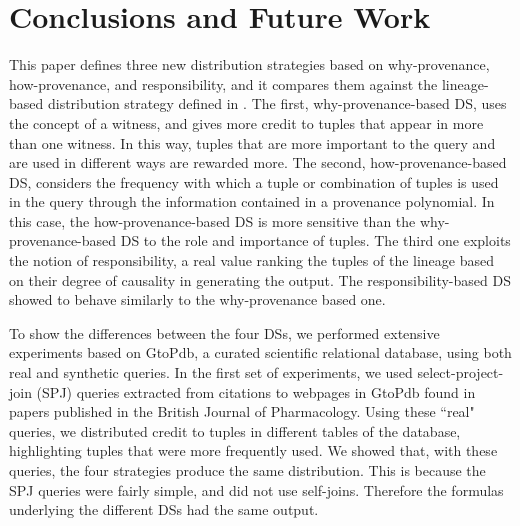 \section{Conclusions and Future Work}
\label{section:conclusions}

This paper 
defines three new distribution strategies based on why-provenance, how-provenance, and responsibility, and it compares them against the lineage-based distribution strategy defined in \cite{dosso2020data}. 
The first, why-provenance-based DS, uses the concept of a witness, and gives more credit to tuples that appear in more than one witness. 
In this way, tuples that are more important to the query and are used in different ways are rewarded more. %
The second, how-provenance-based DS, considers the frequency with which a tuple or combination of tuples is used in the query through the information contained in a provenance polynomial. In this case, the how-provenance-based DS is more sensitive than the why-provenance-based DS to the role and importance of tuples.
The third one exploits the notion of responsibility, a real value ranking the tuples of the lineage based on their degree of causality in generating the output. The responsibility-based DS showed to behave similarly to the why-provenance based one.

To show the differences between the four DSs, we performed extensive experiments based on GtoPdb, a curated scientific relational database, using both real and synthetic queries. 
In the first set of experiments, we used select-project-join (SPJ) queries extracted from citations to webpages in GtoPdb found in papers published in the British Journal of Pharmacology. 
Using these ``real" queries, we distributed credit to tuples in different tables of the database, highlighting tuples that were more frequently used. 
We showed that, with these queries, the four strategies produce the same distribution. This is because the SPJ queries were fairly simple, and did not use self-joins. Therefore the formulas underlying the different DSs had the same output.

